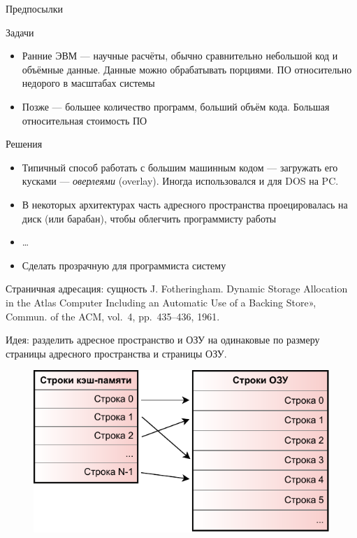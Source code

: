 \documentclass[xetex,aspectratio=43]{beamer}
\begin{document}
\begin{frame}{Предпосылки}
    \begin{block}{Задачи}
        \begin{itemize}
            \tightlist
            \item
            Ранние ЭВМ --- научные расчёты, обычно сравнительно небольшой код и
            объёмные данные. Данные можно обрабатывать порциями. ПО относительно
            недорого в масштабах системы
            \item
            Позже --- большее количество программ, больший объём кода. Большая
            относительная стоимость ПО
        \end{itemize}
    \end{block}

    \begin{block}{Решения}
        \begin{itemize}
            \tightlist
            \item
            Типичный способ работать с большим машинным кодом --- загружать его
            кусками --- \emph{оверлеями} (overlay). Иногда использовался и для DOS
            на PC.
            \item
            В некоторых архитектурах часть адресного пространства проецировалась
            на диск (или барабан), чтобы облегчить программисту работы
            \item
            \ldots{}
            \item
            Сделать прозрачную для программиста систему
        \end{itemize}
    \end{block}
\end{frame}

\begin{frame}{Страничная адресация: сущность}
    J. Fotheringham. Dynamic Storage Allocation in the Atlas Computer
    Including an Automatic Use of a Backing Store», Commun. of the ACM,
    vol.~4, pp.~435--436, 1961.

    Идея: разделить адресное пространство и ОЗУ на одинаковые по размеру страницы адресного
    пространства и страницы ОЗУ.

    \begin{figure}
        \includegraphics[page=2,height=0.55\textheight]{img/06.cache-and-vm-crop.pdf}
    \end{figure}
\end{frame}
\end{document}

